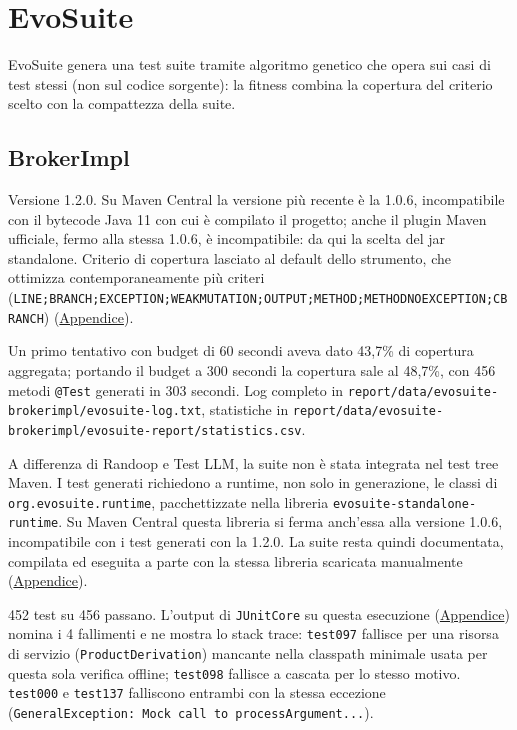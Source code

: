 \section{EvoSuite}
\label{sec:evosuite}

EvoSuite genera una test suite tramite algoritmo genetico che opera sui casi di test stessi (non
sul codice sorgente): la fitness combina la copertura del criterio scelto con la compattezza della
suite.

\subsection{BrokerImpl}

Versione 1.2.0. Su Maven Central la versione più recente è la 1.0.6, incompatibile con il bytecode Java 11
con cui è compilato il progetto; anche il plugin Maven
ufficiale, fermo alla stessa 1.0.6, è incompatibile: da qui la scelta del jar standalone. Criterio di copertura lasciato al default
dello strumento, che ottimizza contemporaneamente più criteri
(\texttt{LINE;BRANCH;EXCEPTION;WEAKMUTATION;OUTPUT;METHOD;METHODNOEXCEPTION;CBRANCH})
(\hyperref[cmd:evosuite-brokerimpl-gen]{Appendice}).

Un primo tentativo con budget di 60 secondi aveva dato 43,7\% di copertura aggregata; portando il
budget a 300 secondi la copertura sale al 48,7\%, con 456 metodi
\texttt{@Test} generati in 303 secondi. Log completo in
\texttt{report/data/evosuite-brokerimpl/evosuite-log.txt}, statistiche in
\texttt{report/data/evosuite-brokerimpl/evosuite-report/statistics.csv}.

A differenza di Randoop e Test LLM, la suite non è stata integrata nel test tree Maven. I test
generati richiedono a runtime, non solo in generazione, le classi di \texttt{org.evosuite.runtime},
pacchettizzate nella libreria
\texttt{evosuite-standalone-runtime}. Su Maven Central questa libreria si ferma anch'essa alla
versione 1.0.6, incompatibile con i test generati con la 1.2.0. La suite resta quindi documentata,
compilata ed eseguita a parte con la stessa libreria scaricata manualmente
(\hyperref[cmd:evosuite-brokerimpl-offline]{Appendice}).

452 test su 456 passano. L'output di \texttt{JUnitCore} su questa esecuzione
(\hyperref[log:evosuite-offline-junitcore]{Appendice}) nomina i 4 fallimenti e ne mostra lo stack
trace: \texttt{test097} fallisce per una risorsa di servizio (\texttt{ProductDerivation}) mancante
nella classpath minimale usata per questa sola verifica offline; \texttt{test098} fallisce a
cascata per lo stesso motivo. \texttt{test000} e \texttt{test137} falliscono entrambi con la stessa
eccezione (\texttt{GeneralException: Mock call to processArgument...}).

